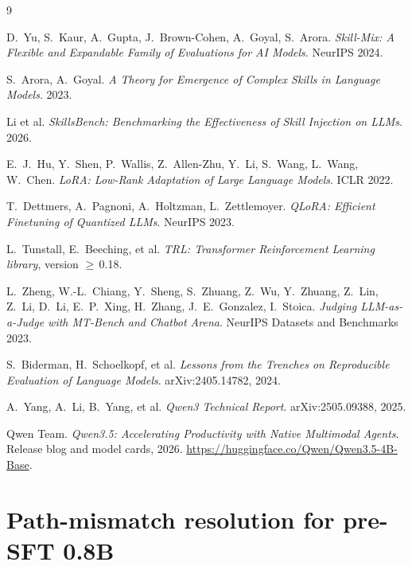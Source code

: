 \documentclass[10pt]{article}
\begin{document}
\begin{thebibliography}{9}

D.~Yu, S.~Kaur, A.~Gupta, J.~Brown-Cohen, A.~Goyal, S.~Arora.
\textit{Skill-Mix: A Flexible and Expandable Family of Evaluations for AI Models}.
NeurIPS 2024.

S.~Arora, A.~Goyal.
\textit{A Theory for Emergence of Complex Skills in Language Models}.
2023.

Li et al.
\textit{SkillsBench: Benchmarking the Effectiveness of Skill Injection on LLMs}.
2026.

E.~J.~Hu, Y.~Shen, P.~Wallis, Z.~Allen-Zhu, Y.~Li, S.~Wang, L.~Wang, W.~Chen.
\textit{LoRA: Low-Rank Adaptation of Large Language Models}.
ICLR 2022.

T.~Dettmers, A.~Pagnoni, A.~Holtzman, L.~Zettlemoyer.
\textit{QLoRA: Efficient Finetuning of Quantized LLMs}.
NeurIPS 2023.

L.~Tunstall, E.~Beeching, et al.
\textit{TRL: Transformer Reinforcement Learning library}, version $\geq$\,0.18.

L.~Zheng, W.-L.~Chiang, Y.~Sheng, S.~Zhuang, Z.~Wu, Y.~Zhuang, Z.~Lin, Z.~Li, D.~Li, E.~P.~Xing, H.~Zhang, J.~E.~Gonzalez, I.~Stoica.
\textit{Judging LLM-as-a-Judge with MT-Bench and Chatbot Arena}.
NeurIPS Datasets and Benchmarks 2023.

S.~Biderman, H.~Schoelkopf, et al.
\textit{Lessons from the Trenches on Reproducible Evaluation of Language Models}.
arXiv:2405.14782, 2024.

A.~Yang, A.~Li, B.~Yang, et al.
\textit{Qwen3 Technical Report}.
arXiv:2505.09388, 2025.

Qwen Team.
\textit{Qwen3.5: Accelerating Productivity with Native Multimodal Agents}.
Release blog and model cards, 2026.
\url{https://huggingface.co/Qwen/Qwen3.5-4B-Base}.

\end{thebibliography}

\appendix

\section{Path-mismatch resolution for pre-SFT 0.8B}\label{sec:appendix-path}
\end{document}
